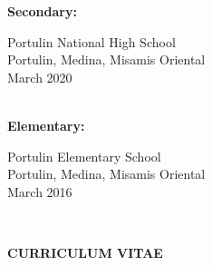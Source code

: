 {\begin{tabbing}
{\bf Secondary:} \> \parbox[t]{3.5in}{Portulin National High School \\
                   Portulin, Medina, Misamis Oriental \\
                   March 2020} \\[18pt]


{\bf Elementary:} \> \parbox[t]{3.5in}{Portulin Elementary School \\
                    Portulin, Medina, Misamis Oriental \\
                    March 2016} \\
\end{tabbing}
}


\newpage


\thispagestyle{empty}


\begin{center}
    {\bf CURRICULUM VITAE}\\[24pt]
\end{center}


